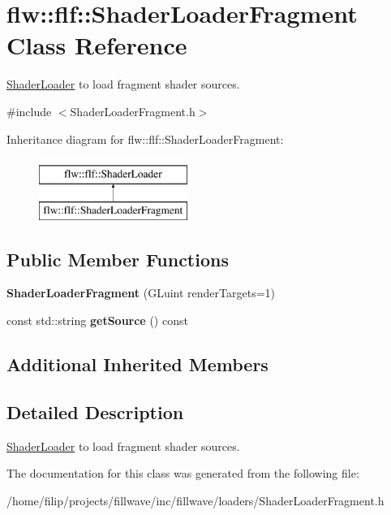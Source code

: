 \hypertarget{classflw_1_1flf_1_1ShaderLoaderFragment}{}\section{flw\+:\+:flf\+:\+:Shader\+Loader\+Fragment Class Reference}
\label{classflw_1_1flf_1_1ShaderLoaderFragment}


\hyperlink{classflw_1_1flf_1_1ShaderLoader}{Shader\+Loader} to load fragment shader sources.  




{\ttfamily \#include $<$Shader\+Loader\+Fragment.\+h$>$}

Inheritance diagram for flw\+:\+:flf\+:\+:Shader\+Loader\+Fragment\+:\begin{figure}[H]
\begin{center}
\leavevmode
\includegraphics[height=2.000000cm]{classflw_1_1flf_1_1ShaderLoaderFragment}
\end{center}
\end{figure}
\subsection*{Public Member Functions}
\begin{DoxyCompactItemize}
\item 
\mbox{\label{classflw_1_1flf_1_1ShaderLoaderFragment_a704f11482f3d215825568b1aeab12a90}} 
{\bfseries Shader\+Loader\+Fragment} (G\+Luint render\+Targets=1)
\item 
\mbox{\label{classflw_1_1flf_1_1ShaderLoaderFragment_ad633d80cea5d1f59733e07a136f0073d}} 
const std\+::string {\bfseries get\+Source} () const
\end{DoxyCompactItemize}
\subsection*{Additional Inherited Members}


\subsection{Detailed Description}
\hyperlink{classflw_1_1flf_1_1ShaderLoader}{Shader\+Loader} to load fragment shader sources. 

The documentation for this class was generated from the following file\+:\begin{DoxyCompactItemize}
\item 
/home/filip/projects/fillwave/inc/fillwave/loaders/Shader\+Loader\+Fragment.\+h\end{DoxyCompactItemize}
